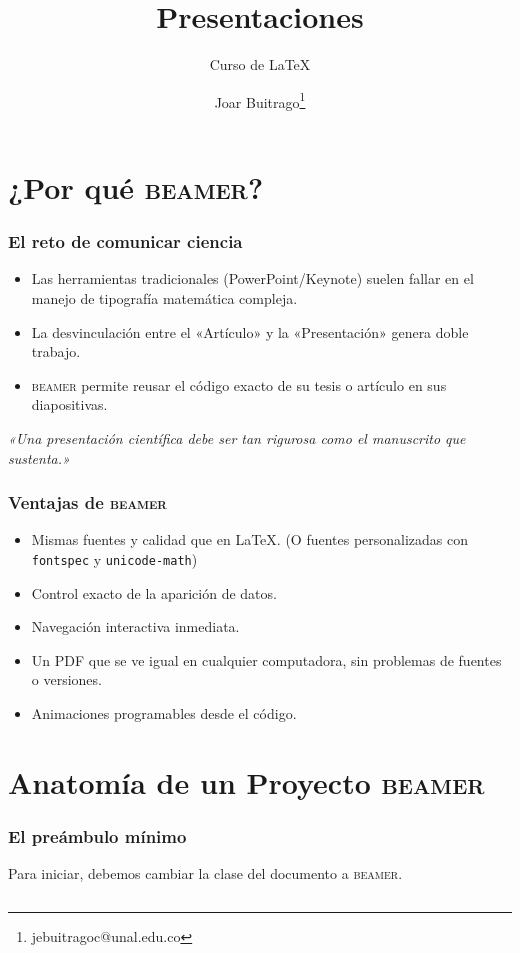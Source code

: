 \documentclass[12pt,aspectratio=169,ignorenonframetext]{ltxbeamer}
\title{Presentaciones {\lmr\mdseries\beamer}}
\subtitle{Curso de {\lmr\LaTeX}}
\author{Joar Buitrago\texorpdfstring{\thanks{jebuitragoc@unal.edu.co}}{ <jebuitragoc@unal.edu.co>}}
\date{}
\newcommand{\beamer}{\textsc{beamer}}
\begin{document}
\begin{frame}
\titlepage
\end{frame}



\section{¿Por qué {\lmr\beamer}?}

\begin{frame}
\frametitle{El reto de comunicar ciencia}
\begin{itemize}
    \item Las herramientas tradicionales (PowerPoint/Keynote) suelen fallar en el manejo de tipografía matemática compleja.
    \item La desvinculación entre el «Artículo» y la «Presentación» genera doble trabajo.
    \item {\lmr\beamer} permite reusar el código exacto de su tesis o artículo en sus diapositivas.
\end{itemize}
\vfill
\centering
\textit{«Una presentación científica debe ser tan rigurosa como el manuscrito que sustenta.»}
\end{frame}



\begin{frame}
\frametitle{Ventajas de {\lmr\beamer}}
\begin{itemize}[<+->]
    \item Mismas fuentes y calidad que en {\lmr\LaTeX}. (O fuentes personalizadas con \texttt{fontspec} y \texttt{unicode-math})
    \item Control exacto de la aparición de datos.
    \item Navegación interactiva inmediata.
    \item Un PDF que se ve igual en cualquier computadora, sin problemas de fuentes o versiones.
    \item Animaciones programables desde el código.
\end{itemize}
\end{frame}



\section{Anatomía de un Proyecto {\lmr\beamer}}

\begin{frame}[fragile]
\frametitle{El preámbulo mínimo}
Para iniciar, debemos cambiar la clase del documento a {\lmr\beamer}.

\inputminted{latex}{resources/minimum.tex}
\end{frame}
\end{document}
